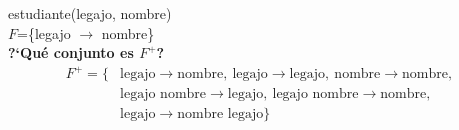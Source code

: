 \documentclass[preview]{standalone}
\begin{document}
estudiante(legajo, nombre)\\
$F$=\{legajo $\rightarrow$ nombre\}\\

\textbf{?`Qu\'e conjunto es $F^+$?}\\
\begin{align*}
	F^+ = \big\{ & \text{legajo} \rightarrow \text{nombre},\ \text{legajo} \rightarrow \text{legajo},\ \text{nombre} \rightarrow \text{nombre},\\
 & \text{legajo nombre} \rightarrow \text{legajo},\ \text{legajo nombre} \rightarrow \text{nombre},\\  
 & \text{legajo} \rightarrow \text{nombre legajo}\big\}   
\end{align*}
\end{document}
